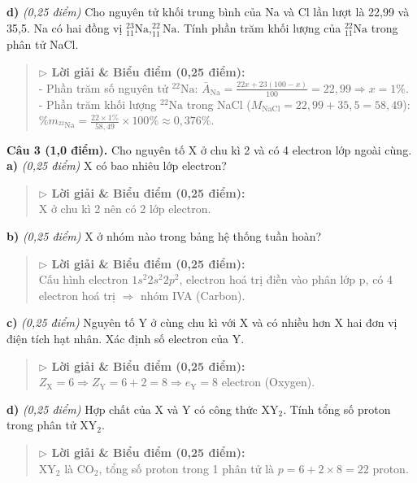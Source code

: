 \documentclass[11pt,a4paper]{article}
\begin{document}
\textbf{d)} \textit{(0,25 điểm)} Cho nguyên tử khối trung bình của Na và Cl lần lượt là 22,99 và 35,5. Na có hai đồng vị $^{23}_{11}\text{Na}, ^{22}_{11}\text{Na}$. Tính phần trăm khối lượng của $^{22}_{11}\text{Na}$ trong phân tử NaCl.\\
\begin{quote}\small
{\color{myBlue}\textbf{$\triangleright$ Lời giải \& Biểu điểm (0,25 điểm):}}\\
- Phần trăm số nguyên tử $^{22}\text{Na}$: $\bar{A}_\text{Na} = \frac{22x + 23(100 - x)}{100} = 22,99 \Rightarrow x = 1\%$.\\
- Phần trăm khối lượng $^{22}\text{Na}$ trong NaCl ($M_\text{NaCl} = 22,99 + 35,5 = 58,49$):\\
$\% m_{^{22}\text{Na}} = \frac{22 \times 1\%}{58,49} \times 100\% \approx 0,376\%$.
\end{quote}


\textbf{Câu 3 (1,0 điểm).} Cho nguyên tố X ở chu kì 2 và có 4 electron lớp ngoài cùng.\\
\textbf{a)} \textit{(0,25 điểm)} X có bao nhiêu lớp electron?\\
\begin{quote}\small
{\color{myBlue}\textbf{$\triangleright$ Lời giải \& Biểu điểm (0,25 điểm):}}\\
X ở chu kì 2 nên có 2 lớp electron.
\end{quote}

\textbf{b)} \textit{(0,25 điểm)} X ở nhóm nào trong bảng hệ thống tuần hoàn?\\
\begin{quote}\small
{\color{myBlue}\textbf{$\triangleright$ Lời giải \& Biểu điểm (0,25 điểm):}}\\
Cấu hình electron $1s^2 2s^2 2p^2$, electron hoá trị điền vào phân lớp p, có 4 electron hoá trị $\Rightarrow$ nhóm IVA (Carbon).
\end{quote}

\textbf{c)} \textit{(0,25 điểm)} Nguyên tố Y ở cùng chu kì với X và có nhiều hơn X hai đơn vị điện tích hạt nhân. Xác định số electron của Y.\\
\begin{quote}\small
{\color{myBlue}\textbf{$\triangleright$ Lời giải \& Biểu điểm (0,25 điểm):}}\\
$Z_\text{X} = 6 \Rightarrow Z_\text{Y} = 6 + 2 = 8 \Rightarrow e_\text{Y} = 8$ electron (Oxygen).
\end{quote}

\textbf{d)} \textit{(0,25 điểm)} Hợp chất của X và Y có công thức $\text{XY}_2$. Tính tổng số proton trong phân tử $\text{XY}_2$.\\
\begin{quote}\small
{\color{myBlue}\textbf{$\triangleright$ Lời giải \& Biểu điểm (0,25 điểm):}}\\
$\text{XY}_2$ là $\text{CO}_2$, tổng số proton trong 1 phân tử là $p = 6 + 2 \times 8 = 22$ proton.
\end{quote}
\end{document}
